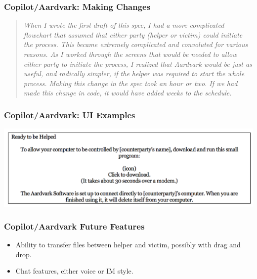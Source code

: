 \begin{frame}
\frametitle{Copilot/Aardvark: Making Changes}

	\begin{changemargin}{1cm}
\begin{quote}
\textit{When I wrote the first draft of this spec, I had a more complicated flowchart that assumed that either party (helper or victim) could initiate the process. This became extremely complicated and convoluted for various reasons. As I worked through the screens that would be needed to allow either party to initiate the process, I realized that Aardvark would be just as useful, and radically simpler, if the helper was required to start the whole process. Making this change in the spec took an hour or two. If we had made this change in code, it would have added weeks to the schedule.}
\end{quote}
	\end{changemargin}
\end{frame}

\begin{frame}
\frametitle{Copilot/Aardvark: UI Examples}


\begin{center}
	\includegraphics[width=\textwidth]{images/aardvarkui.png}
\end{center}

\end{frame}

\begin{frame}
\frametitle{Copilot/Aardvark Future Features}

	\begin{changemargin}{1cm}
	
\begin{itemize}
	\item Ability to transfer files between helper and victim, possibly with drag and drop.
	\item Chat features, either voice or IM style.
\end{itemize}

	\end{changemargin}
\end{frame}

